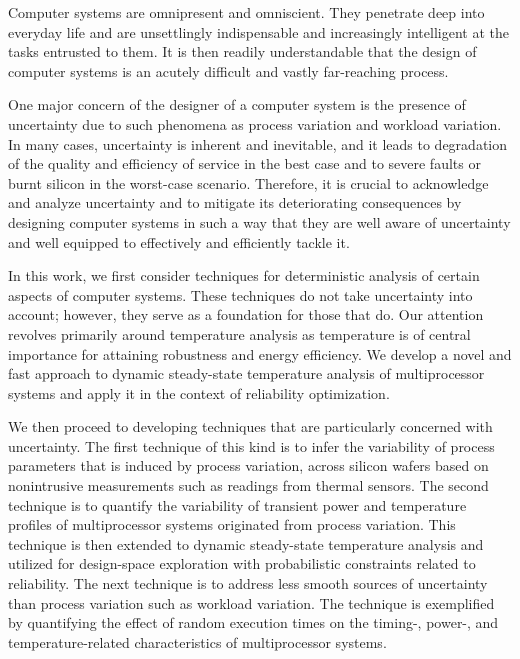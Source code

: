 Computer systems are omnipresent and omniscient. They penetrate deep into
everyday life and are unsettlingly indispensable and increasingly intelligent at
the tasks entrusted to them. It is then readily understandable that the design
of computer systems is an acutely difficult and vastly far-reaching process.

One major concern of the designer of a computer system is the presence of
uncertainty due to such phenomena as process variation and workload variation.
In many cases, uncertainty is inherent and inevitable, and it leads to
degradation of the quality and efficiency of service in the best case and to
severe faults or burnt silicon in the worst-case scenario. Therefore, it is
crucial to acknowledge and analyze uncertainty and to mitigate its deteriorating
consequences by designing computer systems in such a way that they are well
aware of uncertainty and well equipped to effectively and efficiently tackle it.

In this work, we first consider techniques for deterministic analysis of certain
aspects of computer systems. These techniques do not take uncertainty into
account; however, they serve as a foundation for those that do. Our attention
revolves primarily around temperature analysis as temperature is of central
importance for attaining robustness and energy efficiency. We develop a novel
and fast approach to dynamic steady-state temperature analysis of multiprocessor
systems and apply it in the context of reliability optimization.

We then proceed to developing techniques that are particularly concerned with
uncertainty. The first technique of this kind is to infer the variability of
process parameters that is induced by process variation, across silicon wafers
based on nonintrusive measurements such as readings from thermal sensors. The
second technique is to quantify the variability of transient power and
temperature profiles of multiprocessor systems originated from process
variation. This technique is then extended to dynamic steady-state temperature
analysis and utilized for design-space exploration with probabilistic
constraints related to reliability. The next technique is to address less smooth
sources of uncertainty than process variation such as workload variation. The
technique is exemplified by quantifying the effect of random execution times on
the timing-, power-, and temperature-related characteristics of multiprocessor
systems.
